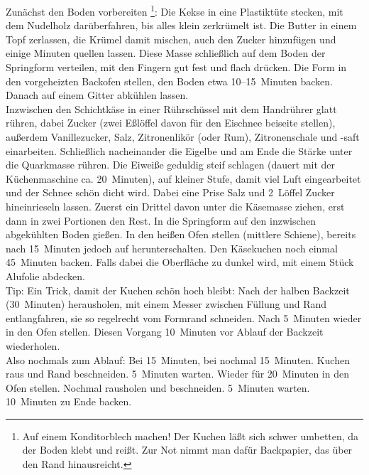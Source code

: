       \begin{zubereitung}
        Zunächst den Boden vorbereiten%
	\footnote{Auf einem Konditorblech machen! Der Kuchen läßt sich schwer
	umbetten, da der Boden klebt und reißt. Zur Not nimmt man dafür
	Backpapier, das über den Rand hinausreicht.}:
	Die Kekse in eine Plastiktüte stecken, mit dem Nudelholz darüberfahren,
	bis alles klein zerkrümelt ist. Die Butter in einem Topf zerlassen, die
	Krümel damit mischen, auch den Zucker hinzufügen und einige Minuten
	quellen lassen. Diese Masse schließlich auf dem Boden der Springform
	verteilen, mit den Fingern gut fest und flach drücken. Die Form in den
	 vorgeheizten Backofen stellen, den Boden etwa 10--15~Minuten
	backen. Danach auf einem Gitter abkühlen lassen. \\
	Inzwischen den Schichtkäse in einer Rührschüssel mit dem Handrührer
	glatt rühren, dabei Zucker (zwei Eßlöffel davon für den Eischnee
	beiseite stellen), außerdem Vanillezucker, Salz, Zitronenlikör (oder
	Rum), Zitronenschale und -saft einarbeiten. Schließlich nacheinander
	die Eigelbe und am Ende die Stärke unter die Quarkmasse rühren. Die
	Eiweiße geduldig steif schlagen (dauert mit der Küchenmaschine ca.
	20~Minuten), auf kleiner Stufe, damit viel Luft eingearbeitet und der
	Schnee schön dicht wird. Dabei eine Prise Salz und 2~Löffel Zucker
	hineinrieseln lassen. Zuerst ein Drittel davon unter die Käsemasse
	ziehen, erst dann in zwei Portionen den Rest. In die Springform auf den
	inzwischen abgekühlten Boden gießen. In den  heißen Ofen
	stellen (mittlere Schiene), bereits nach 15~Minuten jedoch auf
	 herunterschalten. Den Käsekuchen noch einmal 45~Minuten
	backen. Falls dabei die Oberfläche zu dunkel wird, mit einem Stück
	Alufolie abdecken. \\
	Tip: Ein Trick, damit der Kuchen schön hoch bleibt: Nach der halben
	Backzeit (30~Minuten) herausholen, mit einem Messer zwischen Füllung
	und Rand entlangfahren, sie so regelrecht vom Formrand schneiden. Nach
	5~Minuten wieder in den Ofen stellen. Diesen Vorgang 10~Minuten vor
	Ablauf der Backzeit wiederholen. \\
	Also nochmals zum Ablauf: Bei  15~Minuten, bei 
	nochmal 15~Minuten. Kuchen raus und Rand beschneiden. 5~Minuten warten.
	Wieder für 20~Minuten in den Ofen stellen. Nochmal rausholen und
	beschneiden. 5~Minuten warten. 10~Minuten zu Ende backen. \\
      \end{zubereitung}

